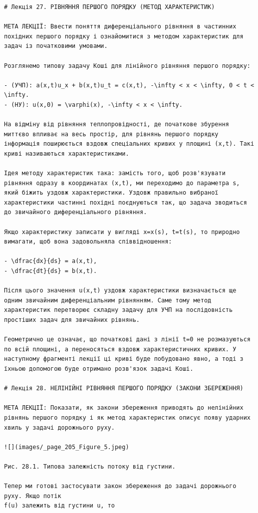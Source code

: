 \documentclass[
  ukrainian,
]{article}
\begin{document}
\begin{verbatim}
# Лекція 27. РІВНЯННЯ ПЕРШОГО ПОРЯДКУ (МЕТОД ХАРАКТЕРИСТИК)

МЕТА ЛЕКЦІЇ: Ввести поняття диференціального рівняння в частинних похідних першого порядку і ознайомитися з методом характеристик для задач із початковими умовами.

Розглянемо типову задачу Коші для лінійного рівняння першого порядку:

- (УЧП): a(x,t)u_x + b(x,t)u_t = c(x,t), -\infty < x < \infty, 0 < t < \infty.
- (НУ): u(x,0) = \varphi(x), -\infty < x < \infty.

На відміну від рівняння теплопровідності, де початкове збурення миттєво впливає на весь простір, для рівнянь першого порядку інформація поширюється вздовж спеціальних кривих у площині (x,t). Такі криві називаються характеристиками.

Ідея методу характеристик така: замість того, щоб розв'язувати рівняння одразу в координатах (x,t), ми переходимо до параметра s, який біжить уздовж характеристики. Уздовж правильно вибраної характеристики частинні похідні поєднуються так, що задача зводиться до звичайного диференціального рівняння.

Якщо характеристику записати у вигляді x=x(s), t=t(s), то природно вимагати, щоб вона задовольняла співвідношення:

- \dfrac{dx}{ds} = a(x,t),
- \dfrac{dt}{ds} = b(x,t).

Після цього значення u(x,t) уздовж характеристики визначається ще одним звичайним диференціальним рівнянням. Саме тому метод характеристик перетворює складну задачу для УЧП на послідовність простіших задач для звичайних рівнянь.

Геометрично це означає, що початкові дані з лінії t=0 не розмазуються по всій площині, а переносяться вздовж характеристичних кривих. У наступному фрагменті лекції ці криві буде побудовано явно, а тоді з їхньою допомогою буде отримано розв'язок задачі Коші.

# Лекція 28. НЕЛІНІЙНІ РІВНЯННЯ ПЕРШОГО ПОРЯДКУ (ЗАКОНИ ЗБЕРЕЖЕННЯ)

МЕТА ЛЕКЦІЇ: Показати, як закони збереження приводять до нелінійних рівнянь першого порядку і як метод характеристик описує появу ударних хвиль у задачі дорожнього руху.

![](images/_page_205_Figure_5.jpeg)

Рис. 28.1. Типова залежність потоку від густини.

Тепер ми готові застосувати закон збереження до задачі дорожнього руху. Якщо потік
f(u) залежить від густини u, то


\end{verbatim}
\end{document}
